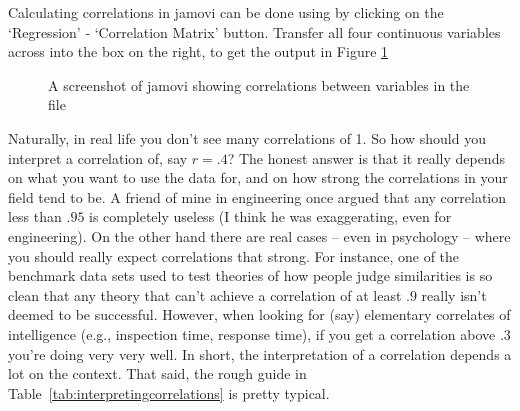 
Calculating correlations in jamovi can be done using by clicking on the `Regression' - `Correlation Matrix' button. Transfer all four continuous variables across into the box on the right, to get the output in Figure \ref{fig:correlations}

\vspace{1cm}
\begin{figure}[h]
\begin{center}
\caption{A screenshot of jamovi showing correlations between variables in the  file}
\label{fig:correlations}
\HR
\end{center}
\end{figure}


 
Naturally, in real life you don't see many correlations of 1. So how should you interpret a correlation of, say $r= .4$? The honest answer is that it really depends on what you want to use the data for, and on how strong the correlations in your field tend to be. A  friend of mine in engineering once argued that any correlation less than $.95$ is completely useless (I think he was exaggerating, even for engineering). On the other hand there are real cases -- even in psychology -- where you should really expect correlations that strong. For instance, one of the benchmark data sets used to test theories of how people judge similarities is so clean that any theory that can't achieve a correlation of at least $.9$ really isn't deemed to be successful. However, when looking for (say) elementary correlates of intelligence (e.g., inspection time, response time), if you get a correlation above $.3$ you're doing very very well. In short, the interpretation of a correlation depends a lot on the context. That said, the rough guide in Table~\ref{tab:interpretingcorrelations} is pretty typical.

